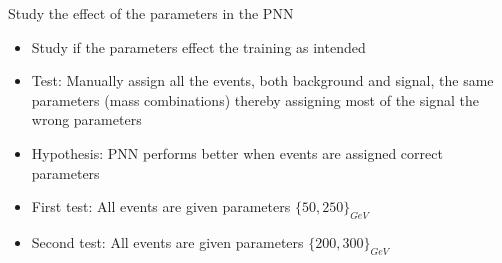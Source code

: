 \documentclass[UKenglish]{beamer}
\begin{document}
\begin{frame}{Study the effect of the parameters in the PNN}
    \begin{itemize}
        \item Study if the parameters effect the training as intended
        \item Test: Manually assign all the events, both background and 
        signal, the same parameters (mass combinations) thereby assigning
        most of the signal the wrong parameters
        \item Hypothesis: PNN performs better when events are assigned correct
              parameters 
        \item First test: All events are given parameters $\{50,250\}_{GeV}$
        \item Second test: All events are given parameters $\{200,300\}_{GeV}$
    \end{itemize}
\end{frame}
\end{document}
